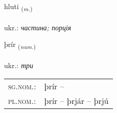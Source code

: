 \documentclass[frontgrid, backgrid]{flacards}\usepackage[]{graphicx}\usepackage[]{xcolor}
\begin{document}
\renewcommand{\flhead}{\vskip5pt \fboxsep=0pt {\small\bfseries\footnotesize Nafnorð | іменник}}
\renewcommand{\fcfoot}{\vskip5pt \fboxsep=0pt \hspace{2pt}{\small\bfseries\footnotesize 1K}}

\renewcommand{\blhead}{\vskip5pt {\small\bfseries\footnotesize Nafnorð | іменник }}
\renewcommand{\bcfoot}{\vskip5pt \hspace{2pt}{\small\bfseries\footnotesize 1K}}


{hluti \small{\textsubscript{(\textit{m.})}} \\[1ex] %
\textphonetic{[l̥ʏːtɪ]} \\
ukr.: \emph{частина; порція} \\  [2ex]
\renewcommand*{\arraystretch}{0.8}
}

\renewcommand{\flhead}{\vskip5pt \fboxsep=0pt {\small\bfseries\footnotesize Töluorð | чисельник}}
\renewcommand{\fcfoot}{\vskip5pt \fboxsep=0pt \hspace{2pt}{\small\bfseries\footnotesize 1K}}

\renewcommand{\blhead}{\vskip5pt {\small\bfseries\footnotesize Töluorð | чисельник }}
\renewcommand{\bcfoot}{\vskip5pt \hspace{2pt}{\small\bfseries\footnotesize 1K}}


{þrír \small{\textsubscript{(\textit{num.})}} \\[1ex] %
\textphonetic{[θriːr]} \\
ukr.: \emph{три} \\  [2ex]
\renewcommand*{\arraystretch}{0.8}
\begin{tabular}{ll}
\textsc{sg.nom.}: & þrír  -- \\ 
\textsc{pl.nom.}: & þrír -- þrjár -- þrjú
\end{tabular}
}
\end{document}
